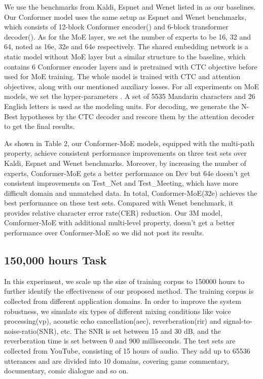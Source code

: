 \documentclass[a4paper]{article}
\begin{document}
We use the benchmarks from Kaldi, Espnet and Wenet listed in \cite{zhang2022wenetspeech} as our baselines. Our Conformer model uses the same setup as Espnet and Wenet benchmarks, which consists of 12-block Conformer encoder() and 6-block transformer decoder(). As for the MoE layer, we set the number of experts to be 16, 32 and 64, noted as 16e, 32e and 64e respectively. The shared embedding network is a static model without MoE layer but a similar structure to the baseline, which contains 6 Conformer encoder layers and is pretrained with CTC objective before used for MoE training. The whole model is trained with CTC and attention objectives, along with our mentioned auxiliary losses. For all experiments on MoE models, we set the hyper-parameters . A set of  5535 Mandarin characters and 26 English letters is used as the modeling units. For decoding, we generate the N-Best hypotheses by the CTC decoder and rescore them by the attention decoder to get the final results.

As shown in Table 2, our Conformer-MoE models, equipped with the multi-path property, achieve consistent performance improvements on three test sets over Kaldi, Espnet and Wenet benchmarks. Moreover, by increasing the number of experts, Conformer-MoE gets a better performance on Dev but 64e doesn't get consistent improvements on Test\_Net and Test\_Meeting, which have more difficult domain and unmatched data. In total, Conformer-MoE(32e) achieves the best performance on these test sets. Compared with Wenet benchmark, it provides  relative character error rate(CER) reduction. Our 3M model, Comformer-MoE with additional multi-level property, doesn't get a better performance over Conformer-MoE so we did not post its results. 










\subsection{150,000 hours Task}
In this experiment, we scale up the size of training corpus to 150000 hours to further identify the effectiveness of our proposed method. The training corpus is collected from different application domains. In order to improve the system robustness, we simulate six types of different mixing conditions like voice processing(vp), acoustic echo cancellation(aec), reverberation(rir) and signal-to-noise-ratio(SNR), etc. The SNR is set between 15 and 30 dB, and the reverberation time is set between 0 and 900 milliseconds. The test sets are collected from YouTube, consisting of 15 hours of audio. They add up to 65536 utterances and are divided into 10 domains, covering game commentary, documentary, comic dialogue and so on.
\end{document}
